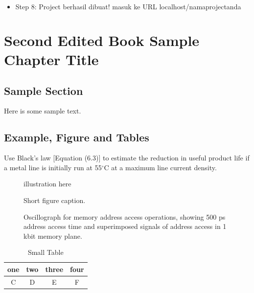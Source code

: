\documentclass{wileySix}
\begin{document}

 \begin{itemize}
 \item Step 8: Project berhasil dibuat! masuk ke URL localhost/namaprojectanda
 \end{itemize}


\chapter{Second Edited Book Sample Chapter Title}

\section{Sample Section}
Here is some sample text.

\newpage

\section{Example, Figure and Tables}
\vskip6pt
\begin{example}
Use Black's law [Equation (6.3)] to estimate the reduction in useful product
life if a metal line is initially run at 55$^\circ$C at a maximum line
current density.
\end{example}




\begin{figure}[ht]
illustration here
\caption{Short figure caption.}
\end{figure}

\begin{figure}[ht]
\vskip2pt
\caption{Oscillograph for  memory address access operations,
showing 500 ps
address access time and superimposed signals
of address access in 1 kbit
memory plane.}
\end{figure}

\begin{table}[ht]
\caption{Small Table}
\centering
\begin{tabular}{cccc}
\hline
one&two&three&four\\
\hline
C&D&E&F\\
\hline
\end{tabular}
\end{table}
\end{document}
